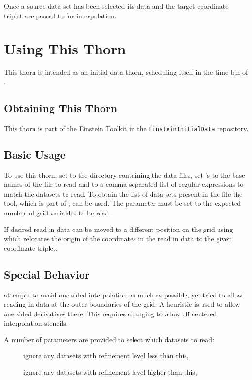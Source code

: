 Once a source data set has been selected its data and the target coordinate
triplet are passed to  for interpolation.

\section{Using This Thorn}
This thorn is intended as an initial data thorn, scheduling itself in the
 time bin of .

\subsection{Obtaining This Thorn}
This thorn is part of the Einstein Toolkit in the \texttt{EinsteinInitialData}
repository.

\subsection{Basic Usage}
To use this thorn, set  to the directory
containing the data files, set 's  to the base
names of the file to read and  to a comma separated
list of regular expressions to match the datasets to read. To obtain the list
of data sets present in the file the  tool, which is part of
, can be used. The parameter
 must be set to the expected number of
grid variables to be read.

If desired read in data can be moved to a different position on the grid using
 which relocates the origin of the
coordinates in the read in data to the given coordinate triplet.

\subsection{Special Behavior}
 attempts to avoid one sided interpolation as much as
possible, yet tried to allow reading in data at the outer boundaries of the
grid. A heuristic is used to allow one sided derivatives there.  This requires
changing  to allow off centered interpolation
stencils.

A number of parameters are provided to select which datasets to read:

\begin{description}
\item[] ignore any datasets with refinement level less
than this,
\item[] ignore any datasets with refinement level
higher than this,
\end{description}

